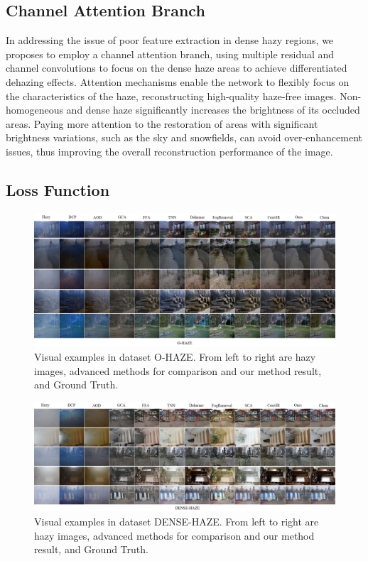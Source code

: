 \documentclass[journal]{IEEEtran}
\begin{document}
\subsection{Channel Attention Branch}
In addressing the issue of poor feature extraction in dense hazy regions, we proposes to employ a channel attention branch, using multiple residual and channel convolutions to focus on the dense haze areas to achieve differentiated dehazing effects.
Attention mechanisms enable the network to flexibly focus on the characteristics of the haze, reconstructing high-quality haze-free images. Non-homogeneous and dense haze significantly increases the brightness of its occluded areas. Paying more attention to the restoration of areas with significant brightness variations, such as the sky and snowfields, can avoid over-enhancement issues, thus improving the overall reconstruction performance of the image.

\subsection{Loss Function}

\begin{figure}[!t]
	\centering
	\includegraphics[width=7in]{images/O-HAZE-compare}
	\caption{Visual examples in dataset O-HAZE. From left to right are hazy images, advanced methods for comparison and our method result, and Ground Truth.}
	\label{fig6}
\end{figure}

\begin{figure}[!t]
	\centering
	\includegraphics[width=7in]{images/DENSE-HAZE-compare}
	\caption{Visual examples in dataset DENSE-HAZE. From left to right are hazy images, advanced methods for comparison and our method result, and Ground Truth.}
	\label{fig7}
\end{figure}
\end{document}
